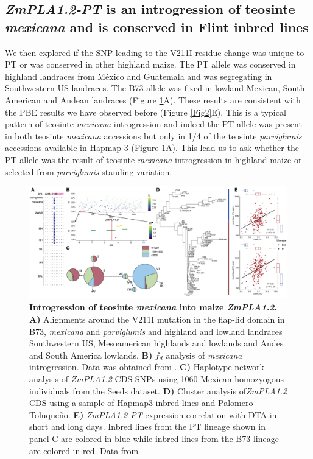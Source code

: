 \documentclass[9pt,twocolumn,twoside,lineno]{BioRxiv}
\begin{document}
\subsection{\textit{ZmPLA1.2-PT} is an introgression of teosinte \textit{mexicana} and is conserved in Flint inbred lines} 
We then explored if the SNP leading to the V211I residue change was unique to PT or was conserved in other highland maize.
The PT allele was conserved in highland landraces from México and Guatemala and was segregating in Southwestern US landraces. 
The B73 allele was fixed in lowland Mexican, South American and Andean landraces (Figure \ref{Fig6}A). 
These results are consistent with the PBE results we have observed before (Figure \ref{Fig2}E).
This is a typical pattern of teosinte \textit{mexicana} introgression \cite{Wang2020-mp} and indeed the PT allele was present in both teosinte \textit{mexicana} accessions but only in 1/4 of the teosinte \textit{parviglumis} accessions available in Hapmap 3 \cite{Bukowski2017-ng} (Figure \ref{Fig6}A). 
This lead us to ask whether the PT allele was the result of teosinte \textit{mexicana} introgression in highland maize or selected from \textit{parviglumis} standing variation.

\begin{figure}[!ht]
\begin{center}
\includegraphics[width=0.8\paperwidth]{Figures/Fig_6.png}
\caption{\textbf{Introgression of teosinte \textit{mexicana} into maize \textit{ZmPLA1.2}.}  
\textbf{A)} Alignments around the V211I mutation in the flap-lid domain in B73, \textit{mexicana} and \textit{parviglumis} and highland and lowland landraces Southwestern US, Mesoamerican highlands and lowlands and Andes and South America lowlands.
\textbf{B)} \(f_d\) analysis of \textit{mexicana} introgression. Data was obtained from \cite{Gonzalez-Segovia2019-jy}. 
\textbf{C)} Haplotype network analysis of \textit{ZmPLA1.2} CDS SNPs using 1060 Mexican homozyogous individuals from the Seeds dataset.
\textbf{D)} Cluster analysis of\textit{ZmPLA1.2} CDS using a sample of Hapmap3 inbred lines and Palomero Toluqueño.
\textbf{E)} \textit{ZmPLA1.2-PT} expression correlation with DTA in short and long days. 
Inbred lines from the PT lineage shown in panel C are colored in blue while inbred lines from the B73 lineage are colored in red.
Data from \cite{Kremling2018-gn}}
\label{Fig6}
\end{center}
\end{figure}
\end{document}
